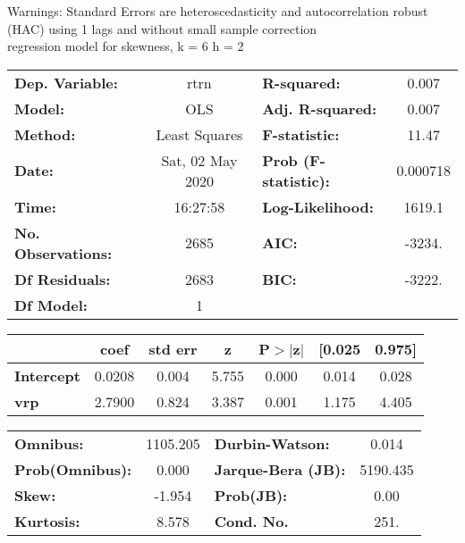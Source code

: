 Warnings: \newline
 [1] Standard Errors are heteroscedasticity and autocorrelation robust (HAC) using 1 lags and without small sample correction\\ 

regression model for skewness, k = 6 h = 2\begin{center}
\begin{tabular}{lclc}
\toprule
\textbf{Dep. Variable:}    &       rtrn       & \textbf{  R-squared:         } &     0.007   \\
\textbf{Model:}            &       OLS        & \textbf{  Adj. R-squared:    } &     0.007   \\
\textbf{Method:}           &  Least Squares   & \textbf{  F-statistic:       } &     11.47   \\
\textbf{Date:}             & Sat, 02 May 2020 & \textbf{  Prob (F-statistic):} &  0.000718   \\
\textbf{Time:}             &     16:27:58     & \textbf{  Log-Likelihood:    } &    1619.1   \\
\textbf{No. Observations:} &        2685      & \textbf{  AIC:               } &    -3234.   \\
\textbf{Df Residuals:}     &        2683      & \textbf{  BIC:               } &    -3222.   \\
\textbf{Df Model:}         &           1      & \textbf{                     } &             \\
\bottomrule
\end{tabular}
\begin{tabular}{lcccccc}
                   & \textbf{coef} & \textbf{std err} & \textbf{z} & \textbf{P$> |$z$|$} & \textbf{[0.025} & \textbf{0.975]}  \\
\midrule
\textbf{Intercept} &       0.0208  &        0.004     &     5.755  &         0.000        &        0.014    &        0.028     \\
\textbf{vrp}       &       2.7900  &        0.824     &     3.387  &         0.001        &        1.175    &        4.405     \\
\bottomrule
\end{tabular}
\begin{tabular}{lclc}
\textbf{Omnibus:}       & 1105.205 & \textbf{  Durbin-Watson:     } &    0.014  \\
\textbf{Prob(Omnibus):} &   0.000  & \textbf{  Jarque-Bera (JB):  } & 5190.435  \\
\textbf{Skew:}          &  -1.954  & \textbf{  Prob(JB):          } &     0.00  \\
\textbf{Kurtosis:}      &   8.578  & \textbf{  Cond. No.          } &     251.  \\
\bottomrule
\end{tabular}
\end{center}

